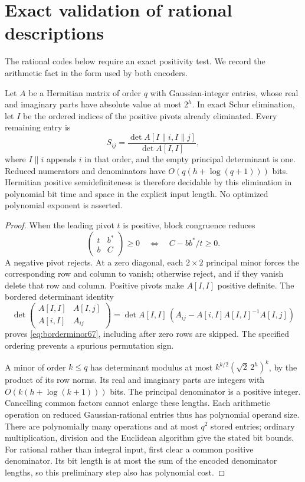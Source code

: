 \section{Exact validation of rational descriptions}
The rational codes below require an exact positivity test. We record
the arithmetic fact in the form used by both encoders.

\begin{lemma}\label{lem:schurminors67}
Let $A$ be a Hermitian matrix of order $q$ with Gaussian-integer entries,
whose real and imaginary parts have absolute value at most $2^h$.
In exact Schur elimination, let $I$ be the ordered indices of the
positive pivots already eliminated. Every remaining entry is
\begin{equation}\label{eq:borderminor67}
 S_{ij}=\frac{\det A[I\mathbin{\|}i,I\mathbin{\|}j]}{\det A[I,I]},
\end{equation}
where $I\mathbin{\|}i$ appends $i$ in that order, and the empty
principal determinant is one. Reduced numerators and denominators
have $O(q(h+\log(q+1)))$ bits. Hermitian positive semidefiniteness is
therefore decidable by this elimination in polynomial bit time and
space in the explicit input length. No optimized polynomial exponent
is asserted.
\end{lemma}
\begin{proof}
When the leading pivot $t$ is positive, block congruence reduces
\[
 \begin{pmatrix}t&b^*\\ b&C\end{pmatrix}\ge0
 \quad\Longleftrightarrow\quad C-bb^*/t\ge0.
\]
A negative pivot rejects. At a zero diagonal, each $2\times2$ principal
minor forces the corresponding row and column to vanish; otherwise
reject, and if they vanish delete that row and column. Positive pivots
make $A[I,I]$ positive definite. The bordered determinant identity
\[
 \det\begin{pmatrix}A[I,I]&A[I,j]\\A[i,I]&A_{ij}\end{pmatrix}
 =\det A[I,I]\,(A_{ij}-A[i,I]A[I,I]^{-1}A[I,j])
\]
proves \eqref{eq:borderminor67}, including after zero rows are skipped.
The specified ordering prevents a spurious permutation sign.

A minor of order $k\le q$ has determinant modulus at most
$k^{k/2}(\sqrt2\,2^h)^k$, by the product of its row norms.
Its real and imaginary parts are integers with
$O(k(h+\log(k+1)))$ bits. The principal denominator is a positive
integer. Cancelling common factors cannot enlarge these lengths.
Each arithmetic operation on reduced Gaussian-rational entries thus
has polynomial operand size. There are polynomially many operations
and at most $q^2$ stored entries; ordinary multiplication, division and
the Euclidean algorithm give the stated bit bounds. For rational
rather than integral input, first clear a common positive denominator.
Its bit length is at most the sum of the encoded denominator lengths,
so this preliminary step also has polynomial cost.
\end{proof}
